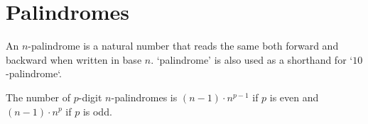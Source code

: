 \documentclass[main.tex]{subfiles}
\begin{document}
\chapter{Palindromes}

\begin{de}
  \label{de:palindrome}
  An $n$-palindrome is a natural number that reads the same both forward and backward when written in base $n$.
  `palindrome' is also used as a shorthand for `$10$-palindrome`.
\end{de}

\begin{th}
  \label{th:number-of-p-digit-n-palindromes}
  The number of $p$-digit $n$-palindromes is $(n-1)\cdot n^{p-1}$ if $p$ is even and $(n-1)\cdot n^{p}$ if $p$ is odd.
\end{th}
\end{document}
